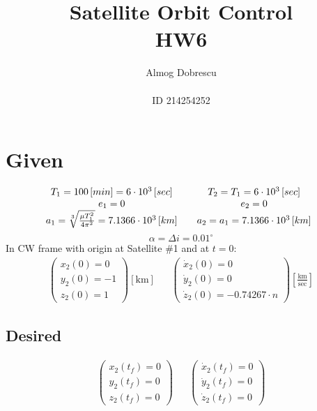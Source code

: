 \documentclass[11pt, a4paper]{article}
\title{Satellite Orbit Control \\ HW6}
\author{Almog Dobrescu\\\\ID 214254252}
\begin{document}
\maketitle

\thispagestyle{empty}
\newpage
\setcounter{page}{1}

\tableofcontents
\vfil
\listoffigures
\newpage

\section{Given}
\begin{equation*}
    \begin{matrix}
        T_1=100\left[min\right] = 6\cdot10^3\left[sec\right] && T_2 = T_1 = 6\cdot10^3\left[sec\right] \\
        e_1 = 0 && e_2 = 0 \\
        a_1 = \sqrt[3]{\frac{\mu T_1^2}{4\pi^2}} = 7.1366\cdot10^3\left[km\right] && a_2 = a_1 = 7.1366\cdot10^3\left[km\right]
    \end{matrix}\\
\end{equation*}
\begin{equation*}
    \alpha=\Delta i = 0.01^\circ
\end{equation*}
In CW frame with origin at Satellite \#1 and at $t=0$:
\begin{equation*}
    \begin{matrix}
    \begin{pmatrix}
        x_2(0)=0 \\ y_2(0)=-1 \\ z_2(0)=1
    \end{pmatrix}\left[\mathrm{km}\right] &&
    \begin{pmatrix}
        \dot{x}_2(0)=0 \\ \dot{y}_2(0) =0 \\ \dot{z}_2(0)=-0.74267\cdot n
    \end{pmatrix}\displaystyle\left[\frac{\mathrm{km}}{\mathrm{sec}}\right]
    \end{matrix}
\end{equation*}

\subsection{Desired}
\begin{equation*}
    \begin{matrix}
    \begin{pmatrix}
        x_2(t_f)=0 \\ y_2(t_f)=0 \\ z_2(t_f)=0
    \end{pmatrix} &&
    \begin{pmatrix}
        \dot{x}_2(t_f)=0 \\ \dot{y}_2(t_f)=0 \\ \dot{z}_2(t_f)=0
    \end{pmatrix}
    \end{matrix}
\end{equation*}
\end{document}

